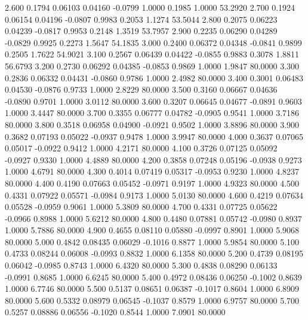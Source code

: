    2.600   0.1794   0.06103   0.04160  -0.0799   1.0000   0.1985   1.0000  53.2920
   2.700   0.1924   0.06154   0.04196  -0.0807   0.9983   0.2053   1.1274  53.5044
   2.800   0.2075   0.06223   0.04239  -0.0817   0.9953   0.2148   1.3519  53.7957
   2.900   0.2235   0.06290   0.04289  -0.0829   0.9925   0.2273   1.5647  54.1835
   3.000   0.2400   0.06372   0.04348  -0.0841   0.9899   0.2505   1.7622  54.9021
   3.100   0.2567   0.06439   0.04422  -0.0855   0.9883   0.3078   1.8811  56.6793
   3.200   0.2730   0.06292   0.04385  -0.0853   0.9869   1.0000   1.9847  80.0000
   3.300   0.2836   0.06332   0.04431  -0.0860   0.9786   1.0000   2.4982  80.0000
   3.400   0.3001   0.06483   0.04530  -0.0876   0.9733   1.0000   2.8229  80.0000
   3.500   0.3160   0.06667   0.04636  -0.0890   0.9701   1.0000   3.0112  80.0000
   3.600   0.3207   0.06645   0.04677  -0.0891   0.9603   1.0000   3.4447  80.0000
   3.700   0.3355   0.06777   0.04782  -0.0905   0.9541   1.0000   3.7186  80.0000
   3.800   0.3518   0.06958   0.04900  -0.0921   0.9502   1.0000   3.8896  80.0000
   3.900   0.3682   0.07193   0.05022  -0.0937   0.9478   1.0000   3.9947  80.0000
   4.000   0.3637   0.07065   0.05017  -0.0922   0.9412   1.0000   4.2171  80.0000
   4.100   0.3726   0.07125   0.05092  -0.0927   0.9330   1.0000   4.4889  80.0000
   4.200   0.3858   0.07248   0.05196  -0.0938   0.9273   1.0000   4.6791  80.0000
   4.300   0.4014   0.07419   0.05317  -0.0953   0.9230   1.0000   4.8237  80.0000
   4.400   0.4190   0.07663   0.05452  -0.0971   0.9197   1.0000   4.9323  80.0000
   4.500   0.4331   0.07922   0.05571  -0.0984   0.9173   1.0000   5.0130  80.0000
   4.600   0.4219   0.07634   0.05528  -0.0959   0.9061   1.0000   5.3809  80.0000
   4.700   0.4331   0.07725   0.05622  -0.0966   0.8988   1.0000   5.6212  80.0000
   4.800   0.4480   0.07881   0.05742  -0.0980   0.8937   1.0000   5.7886  80.0000
   4.900   0.4655   0.08110   0.05880  -0.0997   0.8901   1.0000   5.9068  80.0000
   5.000   0.4842   0.08435   0.06029  -0.1016   0.8877   1.0000   5.9854  80.0000
   5.100   0.4733   0.08244   0.06008  -0.0993   0.8832   1.0000   6.1358  80.0000
   5.200   0.4739   0.08195   0.06042  -0.0985   0.8743   1.0000   6.4320  80.0000
   5.300   0.4838   0.08290   0.06133  -0.0991   0.8685   1.0000   6.6245  80.0000
   5.400   0.4972   0.08436   0.06250  -0.1002   0.8639   1.0000   6.7746  80.0000
   5.500   0.5137   0.08651   0.06387  -0.1017   0.8604   1.0000   6.8909  80.0000
   5.600   0.5332   0.08979   0.06545  -0.1037   0.8579   1.0000   6.9757  80.0000
   5.700   0.5257   0.08886   0.06556  -0.1020   0.8544   1.0000   7.0901  80.0000
